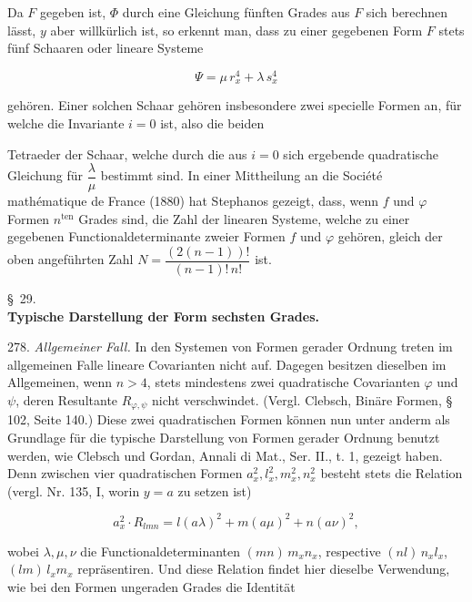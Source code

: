 Da $F$ gegeben ist, $\Phi$ durch eine Gleichung fünften Grades aus $F$ sich berechnen lässt, $y$ aber willkürlich ist, so erkennt man, dass zu einer gegebenen Form $F$ stets fünf Schaaren oder lineare Systeme

\[
\Psi = \mu\, r_x^4 + \lambda\, s_x^4
\]

gehören. Einer solchen Schaar gehören insbesondere zwei specielle Formen an, für welche die Invariante $i = 0$ ist, also die beiden


Tetraeder der Schaar, welche durch die aus $i = 0$ sich ergebende quadratische Gleichung für $\dfrac{\lambda}{\mu}$ bestimmt sind. In einer Mittheilung an die Société mathématique de France (1880) hat Stephanos gezeigt, dass, wenn $f$ und $\varphi$ Formen $n^{\text{ten}}$ Grades sind, die Zahl der linearen Systeme, welche zu einer gegebenen Functionaldeterminante zweier Formen $f$ und $\varphi$ gehören, gleich der oben angeführten Zahl $N = \dfrac{(2(n-1))!}{(n-1)!\,n!}$ ist.

\begin{center}
\S~29.\\
\textbf{Typische Darstellung der Form sechsten Grades.}
\end{center}

278. \textit{Allgemeiner Fall.} In den Systemen von Formen gerader Ordnung treten im allgemeinen Falle lineare Covarianten nicht auf. Dagegen besitzen dieselben im Allgemeinen, wenn $n > 4$, stets mindestens zwei quadratische Covarianten $\varphi$ und $\psi$, deren Resultante $R_{\varphi,\psi}$ nicht verschwindet. (Vergl. Clebsch, \glqq Binäre Formen\grqq, § 102, Seite 140.) Diese zwei quadratischen Formen können nun unter anderm als Grundlage für die typische Darstellung von Formen gerader Ordnung benutzt werden, wie Clebsch und Gordan, Annali di Mat., Ser. II., t. 1, gezeigt haben. Denn zwischen vier quadratischen Formen $a_x^2, l_x^2, m_x^2, n_x^2$ besteht stets die Relation (vergl. Nr. 135, I, worin $y = a$ zu setzen ist)

\[
a_x^2 \cdot R_{lmn} = l(a\lambda)^2 + m(a\mu)^2 + n(a\nu)^2,
\]

wobei $\lambda, \mu, \nu$ die Functionaldeterminanten $(mn)\,m_xn_x$, respective $(nl)\,n_xl_x$, $(lm)\,l_xm_x$ repräsentiren. Und diese Relation findet hier dieselbe Verwendung, wie bei den Formen ungeraden Grades die Identität

